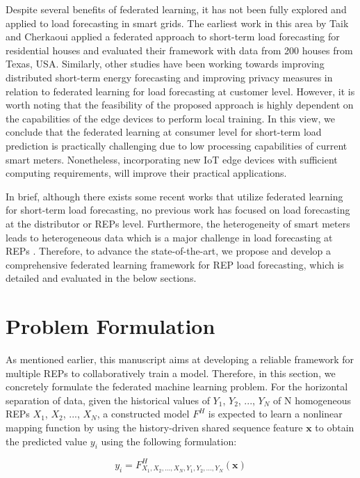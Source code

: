 \documentclass[10pt, conference]{IEEEtran}
\begin{document}
Despite several benefits of federated learning, it has not been fully explored and applied to load forecasting in smart grids. The earliest work in this area by Taik and Cherkaoui \cite{9148937} applied a federated approach to short-term load forecasting for residential houses and evaluated their framework with data from 200 houses from Texas, USA. Similarly, other studies \cite{Fekri_Grolinger_Mir_2021, Gholizadeh_Musilek_2022} have been working towards improving distributed short-term energy forecasting and improving privacy measures in relation to federated learning for load forecasting at customer level. However, it is worth noting that the feasibility of the proposed approach is highly dependent on the capabilities of the edge devices to perform local training. In this view, we conclude that the federated learning at consumer level for short-term load prediction is practically challenging due to low processing capabilities of current smart meters. Nonetheless, incorporating new IoT edge devices with sufficient computing requirements, will improve their practical applications.

In brief, although there exists some recent works that utilize federated learning for short-term load forecasting, no previous work has focused on load forecasting at the distributor or REPs level. Furthermore, the heterogeneity of smart meters leads to heterogeneous data  which is a major challenge in load forecasting at REPs \cite{5195790}. Therefore, to advance the state-of-the-art, we propose and develop a comprehensive federated learning framework for REP load forecasting, which is detailed and evaluated in the below sections.

\section{Problem Formulation}
\label{sec:probform}
As mentioned earlier, this manuscript aims at developing a reliable framework for multiple REPs to collaboratively train a model. Therefore, in this section, we concretely formulate the federated machine learning problem. For the horizontal separation of data, given the historical values of {$Y_1$, $Y_2$, ..., $Y_N$} of N homogeneous REPs {$X_1$, $X_2$, ..., $X_N$}, a constructed model $F^H$ is expected to learn a nonlinear mapping function by using the history-driven shared sequence feature $\textbf{x}$ to obtain the predicted value $y_i$ using the following formulation:

\begin{equation}
    y_i = F^H_{X_1, X_2, ..., X_N, Y_1, Y_2, ..., Y_N} (\textbf{x})
\end{equation}
\end{document}
